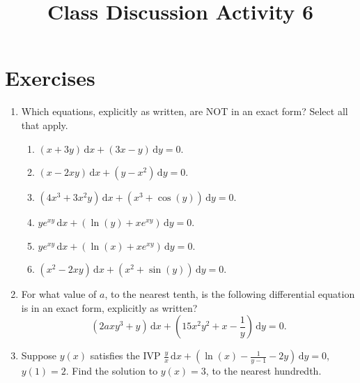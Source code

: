 \documentclass{ximera}
\begin{document}
\begin{abstract}
 \end{abstract}

    \title{Class Discussion Activity 6}
    
    \maketitle

\section*{Exercises}

\begin{enumerate}[label=(\arabic*)]



\item Which equations, explicitly as written, are NOT in an exact form?  Select all that apply.

\begin{enumerate}[label=(\alph*)]
\item $(x+3y)\,\mathrm{d}x+(3x-y)\,\mathrm{d}y=0$.
\item $(x-2xy)\,\mathrm{d}x+(y-x^2)\,\mathrm{d}y=0$.
\item $(4x^3+3x^2y)\,\mathrm{d}x+(x^3+\cos{(y)})\,\mathrm{d}y=0$.
\item $ye^{xy}\,\mathrm{d}x+\left(\ln{(y)}+xe^{xy}\right)\,\mathrm{d}y=0$.
\item $ye^{xy}\,\mathrm{d}x+\left(\ln{(x)}+xe^{xy}\right)\,\mathrm{d}y=0$.
\item $(x^2-2xy)\,\mathrm{d}x+(x^2+\sin{(y)})\,\mathrm{d}y=0$.  %
\end{enumerate}



    \item For what value of $a$, to the nearest tenth, is the following differential equation is in an exact form, explicitly as written?  $$ \left(2axy^3+y\right)\,\mathrm{d}x+\left(15x^2y^2+x-\frac{1}{y}\right)\,\mathrm{d}y=0.$$




\item Suppose $y(x)$ satisfies the IVP $\displaystyle \frac{y}{x}\,\mathrm{d}x +\left(\ln{(x)}-\frac{1}{y-1}-2y\right)\, \mathrm{d}y=0$, $y(1)=2$.  Find the solution to $y(x)=3$, to the nearest hundredth.\\


\end{enumerate}
\end{document}
